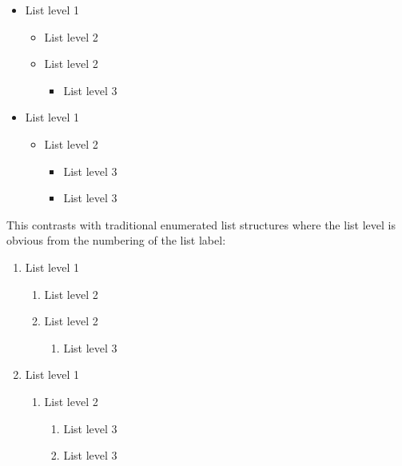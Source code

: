 \documentclass{beery}
\begin{document}
\begin{multicols}{2}
  \begin{itemize}[label=\textbullet]
    \item List level 1
    \begin{itemize}[label=\textbf{--}]
      \item List level 2
      \item List level 2
      \begin{itemize}[label=\textasteriskcentered]
        \item List level 3
      \end{itemize}
    \end{itemize}
    \item List level 1
    \begin{itemize}[label=\textbf{--}]
      \item List level 2
      \begin{itemize}[label=\textasteriskcentered]
        \item List level 3
        \item List level 3
      \end{itemize}
    \end{itemize}
  \end{itemize}
\end{multicols}

This contrasts with traditional enumerated list structures where the list level is obvious from the numbering of the list label:

\begin{multicols}{2}
  \begin{enumerate}
    \item List level 1
    \begin{enumerate}
      \item List level 2
      \item List level 2
      \begin{enumerate}
        \item List level 3
      \end{enumerate}
    \end{enumerate}
    \item List level 1
    \begin{enumerate}
      \item List level 2
      \begin{enumerate}
        \item List level 3
        \item List level 3
      \end{enumerate}
    \end{enumerate}
  \end{enumerate}
\end{multicols}
\end{document}
